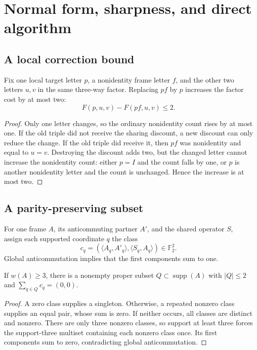 \section{Normal form, sharpness, and direct algorithm}

\subsection{A local correction bound}
\begin{lemma}
Fix one local target letter $p$, a nonidentity frame letter $f$, and the other two letters $u,v$ in the same three-way factor. Replacing $pf$ by $p$ increases the factor cost by at most two:
\[
F(p,u,v)-F(pf,u,v)\le 2.
\]
\end{lemma}
\begin{proof}
Only one letter changes, so the ordinary nonidentity count rises by at most one. If the old triple did not receive the sharing discount, a new discount can only reduce the change. If the old triple did receive it, then $pf$ was nonidentity and equal to $u=v$. Destroying the discount adds two, but the changed letter cannot increase the nonidentity count: either $p=I$ and the count falls by one, or $p$ is another nonidentity letter and the count is unchanged. Hence the increase is at most two.
\end{proof}

\subsection{A parity-preserving subset}
For one frame $A$, its anticommuting partner $A'$, and the shared operator $S$, assign each supported coordinate $q$ the class
\[
c_q=(\langle A_q,A'_q\rangle,\langle S_q,A_q\rangle)\in\mathbb F_2^2.
\]
Global anticommutation implies that the first components sum to one.

\begin{lemma}
If $w(A)\ge 3$, there is a nonempty proper subset $Q\subset\operatorname{supp}(A)$ with $|Q|\le2$ and $\sum_{q\in Q}c_q=(0,0)$.
\end{lemma}
\begin{proof}
A zero class supplies a singleton. Otherwise, a repeated nonzero class supplies an equal pair, whose sum is zero. If neither occurs, all classes are distinct and nonzero. There are only three nonzero classes, so support at least three forces the support-three multiset containing each nonzero class once. Its first components sum to zero, contradicting global anticommutation.
\end{proof}

